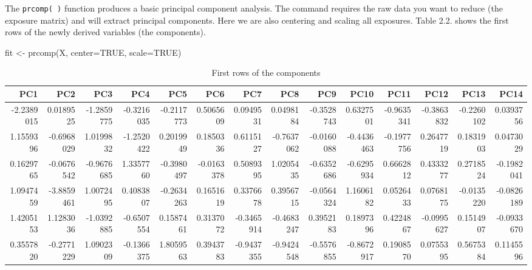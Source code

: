 \documentclass[
]{book}
\newenvironment{Shaded}{\begin{snugshade}}{\end{snugshade}}
\newcommand{\AttributeTok}[1]{\textcolor[rgb]{0.77,0.63,0.00}{#1}}
\newcommand{\ConstantTok}[1]{\textcolor[rgb]{0.00,0.00,0.00}{#1}}
\newcommand{\FunctionTok}[1]{\textcolor[rgb]{0.00,0.00,0.00}{#1}}
\newcommand{\NormalTok}[1]{#1}
\newcommand{\OtherTok}[1]{\textcolor[rgb]{0.56,0.35,0.01}{#1}}
\begin{document}
The \texttt{prcomp(\ )} function produces a basic principal component analysis. The command requires the raw data you want to reduce (the exposure matrix) and will extract principal components. Here we are also centering and scaling all exposures. Table 2.2. shows the first rows of the newly derived variables (the components).

\begin{Shaded}
\begin{Highlighting}[]
\NormalTok{fit }\OtherTok{\textless{}{-}} \FunctionTok{prcomp}\NormalTok{(X, }\AttributeTok{center=}\ConstantTok{TRUE}\NormalTok{, }\AttributeTok{scale=}\ConstantTok{TRUE}\NormalTok{)}
\end{Highlighting}
\end{Shaded}

\begin{table}

\caption{\label{tab:unnamed-chunk-8}First rows of the components}
\centering
\begin{tabular}[t]{r|r|r|r|r|r|r|r|r|r|r|r|r|r}
\hline
PC1 & PC2 & PC3 & PC4 & PC5 & PC6 & PC7 & PC8 & PC9 & PC10 & PC11 & PC12 & PC13 & PC14\\
\hline
-2.2389015 & 0.0189525 & -1.2859775 & -0.3216035 & -0.2117773 & 0.5065609 & 0.0949531 & 0.0498184 & -0.3528743 & 0.6327501 & -0.9635341 & -0.3863832 & -0.2260102 & 0.0393756\\
\hline
1.1559396 & -0.6968029 & 1.0199832 & -1.2520422 & 0.2019949 & 0.1850336 & 0.6115127 & -0.7637062 & -0.0160088 & -0.4436463 & -0.1977756 & 0.2647719 & 0.1831903 & 0.0473029\\
\hline
0.1629765 & -0.0676542 & -0.9676685 & 1.3357760 & -0.3980497 & -0.0163378 & 0.5089395 & 1.0205435 & -0.6352686 & -0.6295934 & 0.6662812 & 0.4333277 & 0.2718524 & -0.1982041\\
\hline
1.0947459 & -3.8859461 & 1.0072495 & 0.4083807 & -0.2634263 & 0.1651619 & 0.3376678 & 0.3956715 & -0.0564324 & 1.1606182 & 0.0526433 & 0.0768175 & -0.0135220 & -0.0826189\\
\hline
1.4205153 & 1.1283036 & -1.0392885 & -0.6507554 & 0.1587461 & 0.3137072 & -0.3465914 & -0.4683247 & 0.3952183 & 0.1897396 & 0.4224867 & -0.0995627 & 0.1514907 & -0.0933670\\
\hline
0.3557820 & -0.2771229 & 1.0902309 & -0.1366375 & 1.8059563 & 0.3943783 & -0.9437355 & -0.9424548 & -0.5576855 & -0.8672917 & 0.1908570 & 0.0755395 & 0.5675384 & 0.1145596\\
\hline
\end{tabular}
\end{table}
\end{document}
